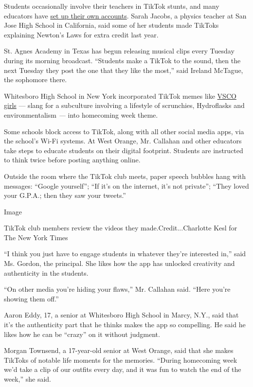 Students occasionally involve their teachers in TikTok stunts, and many
educators have \href{http://vm.tiktok.com/5qKoQd/}{set up their own
accounts}. Sarah Jacobs, a physics teacher at San Jose High School in
California, said some of her students made TikToks explaining Newton's
Laws for extra credit last year.

St. Agnes Academy in Texas has begun releasing musical clips every
Tuesday during its morning broadcast. ``Students make a TikTok to the
sound, then the next Tuesday they post the one that they like the
most,'' said Ireland McTague, the sophomore there.

Whitesboro High School in New York incorporated TikTok memes like
\href{https://www.nytimes.com/2019/08/30/style/vsco-girls.html}{VSCO
girls} --- slang for a subculture involving a lifestyle of scrunchies,
Hydroflasks and environmentalism \emph{---} into homecoming week theme.

Some schools block access to TikTok, along with all other social media
apps, via the school's Wi-Fi systems. At West Orange, Mr. Callahan and
other educators take steps to educate students on their digital
footprint. Students are instructed to think twice before posting
anything online.

Outside the room where the TikTok club meets, paper speech bubbles hang
with messages: ``Google yourself''; ``If it's on the internet, it's not
private''; ``They loved your G.P.A.; then they saw your tweets.''

Image

TikTok club members review the videos they made.Credit...Charlotte Kesl
for The New York Times

``I think you just have to engage students in whatever they're
interested in,'' said Ms. Gordon, the principal. She likes how the app
has unlocked creativity and authenticity in the students.

``On other media you're hiding your flaws,'' Mr. Callahan said. ``Here
you're showing them off.''

Aaron Eddy, 17, a senior at Whitesboro High School in Marcy, N.Y., said
that it's the authenticity part that he thinks makes the app so
compelling. He said he likes how he can be ``crazy'' on it without
judgment.

Morgan Townsend, a 17-year-old senior at West Orange, said that she
makes TikToks of notable life moments for the memories. ``During
homecoming week we'd take a clip of our outfits every day, and it was
fun to watch the end of the week,'' she said.


